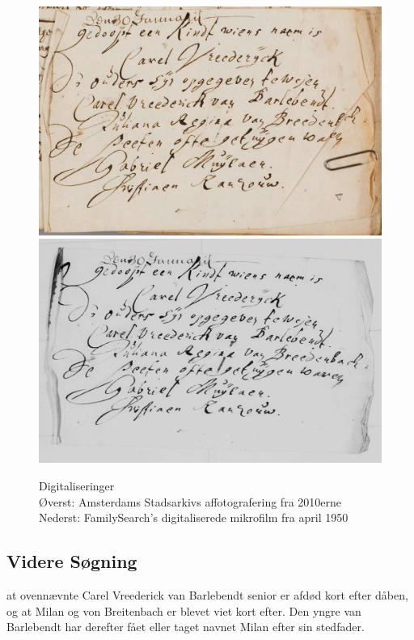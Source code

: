 \documentclass[
	a4paper,
	12pt,
	final
]{memoir}
\begin{document}
\begin{figure}[H]%
	\centerfloat%
	\includegraphics[width=\textwidth]{seddel.png}\\%
	\includegraphics[width=\textwidth]{kb-old.png}\\%
	\caption{Digitaliseringer\\\smaller Øverst: Amsterdams Stadsarkivs affotografering fra 2010erne\\Nederst: FamilySearch's digitaliserede mikrofilm fra april 1950}%
\end{figure}%

\subsection{Videre Søgning}

 at ovennævnte Carel Vreederick van Barlebendt senior er afdød kort efter dåben, og at Milan og von Breitenbach er blevet viet kort efter. Den yngre van Barlebendt har derefter fået eller taget navnet Milan efter sin stedfader.
\end{document}
